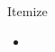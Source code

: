 \documentclass[compress,aspectratio=169]{beamer}
\begin{document}
\begin{frame}{Itemize}
  \begin{itemize}
    \item
  \end{itemize}
\end{frame}
%
%
%
%
%
%
\end{document}
